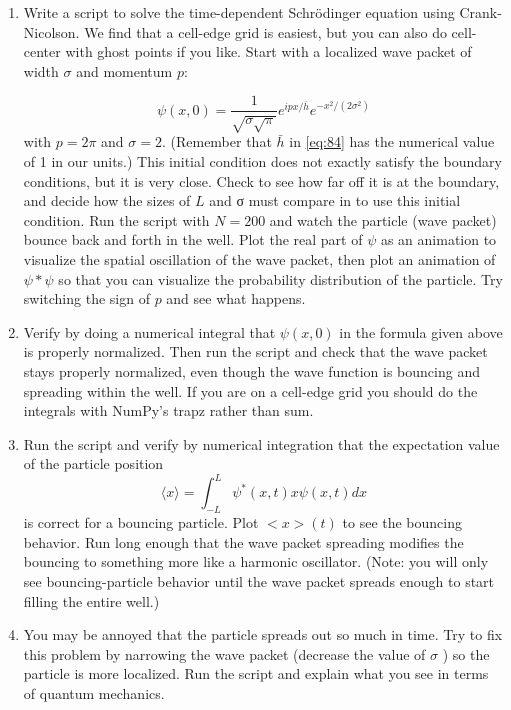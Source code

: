 \begin{enumerate}[label=(\alph*)]
	\item  Write a script to solve the time-dependent Schr{\"o}dinger equation using
Crank-Nicolson. We find that a cell-edge grid is easiest, but you can
also do cell-center with ghost points if you like. Start with a localized
wave packet of width $\sigma$ and momentum $p$:

\begin{equation}\label{eq:84}
\psi(x, 0)=\frac{1}{\sqrt{\sigma \sqrt{\pi}}} e^{i p x / \bar{h}} e^{-x^{2} /\left(2 \sigma^{2}\right)}
\end{equation}
with $p = 2\pi$ and $\sigma = 2$. (Remember that $ \bar{h}$ in \eqref{eq:84} has the numerical
value of 1 in our units.) This initial condition does not exactly satisfy
the boundary conditions, but it is very close. Check to see how far
off it is at the boundary, and decide how the sizes of $L$ and σ must
compare in to use this initial condition.
Run the script with $N = 200$ and watch the particle (wave packet)
bounce back and forth in the well. Plot the real part of $\psi$ as an animation to visualize the spatial oscillation of the wave packet, then
plot an animation of $\psi * \psi$  so that you can visualize the probability
distribution of the particle. Try switching the sign of $p$ and see what
happens.
\item Verify by doing a numerical integral that $\psi(x,0)$ in the formula given
above is properly normalized. Then run the script and check that
the wave packet stays properly normalized, even though the wave
function is bouncing and spreading within the well. If you are on a
cell-edge grid you should do the integrals with NumPy\rq s trapz rather
than sum.
\item Run the script and verify by numerical integration that the expectation
value of the particle position
\begin{equation}\label{eq:85}
\langle x\rangle=\int_{-L}^{L} \psi^{*}(x, t) x \psi(x, t) d x
\end{equation}
is correct for a bouncing particle. Plot $<x>(t)$ to see the bouncing
behavior. Run long enough that the wave packet spreading modifies
the bouncing to something more like a harmonic oscillator. (Note:
you will only see bouncing-particle behavior until the wave packet
spreads enough to start filling the entire well.)
\item You may be annoyed that the particle spreads out so much in time.
Try to fix this problem by narrowing the wave packet (decrease the
value of $\sigma$ ) so the particle is more localized. Run the script and explain
what you see in terms of quantum mechanics.


\end{enumerate}
